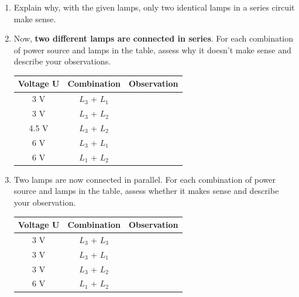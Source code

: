 \documentclass[a4paper]{article}
\begin{document}
\begin{enumerate}[1.]
\begin{minipage}{0.5\textwidth}
			\renewcommand{\arraystretch}{2}
			\begin{tabular}{|p{1.6 cm}|p{1.6 cm}|p{1.6 cm}|p{1.6 cm}|}
				\hline
				$U_{ges}$ & $I_{ges}$ & $R_{ges}$ & $P_{ges}$ \\
				\hline
				& & & \\
				\hline
			\end{tabular}
		\end{minipage}
		\vspace{0.5 cm}
		
		\item Explain why, with the given lamps, only two identical lamps in a series circuit make sense.
		\item Now, {\bf two different lamps are connected in series}.
		For each combination of power source and lamps in the table, assess why it doesn't make sense and describe your observations.
		
		\renewcommand{\arraystretch}{2}
		\begin{tabular}{|c|c|p{12 cm}|}
			\hline
			Voltage U & Combination & Observation \\
			\hline
			3 V & $L_3$ + $L_1$ & \\
			\hline
			3 V & $L_3$ + $L_2$ & \\
			\hline
			4.5 V & $L_3$ + $L_2$ & \\
			\hline
			6 V & $L_3$ + $L_1$ & \\
			\hline
			6 V & $L_1$ + $L_2$ & \\
			\hline
		\end{tabular}
		
		\newpage
		
		\item Two lamps are now connected in parallel.
		For each combination of power source and lamps in the table, assess whether it makes sense and describe your observation.
		
		\renewcommand{\arraystretch}{2}
		\begin{tabular}{|c|c|p{12 cm}|}
			\hline
			Voltage U & Combination & Observation \\
			\hline
			3 V & $L_3$ + $L_3$ & \\
			\hline
			3 V & $L_3$ + $L_1$ & \\
			\hline
			3 V & $L_3$ + $L_2$ & \\
			\hline
			6 V & $L_1$ + $L_2$ & \\
			\hline
		\end{tabular}
		
		\end{enumerate}
		
\end{document}
